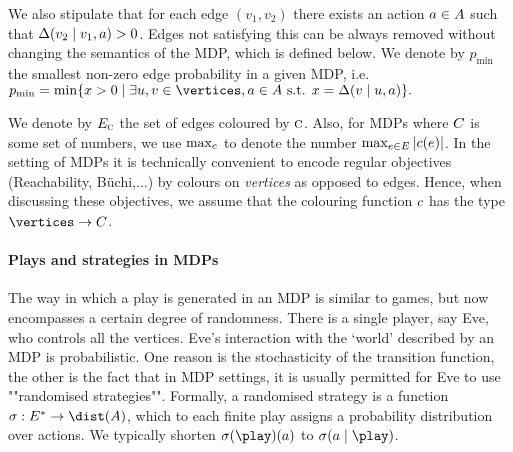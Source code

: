We also stipulate that for each edge $(v_1,v_2)$ there exists an action $a\in A$ such that $\Delta(v_2\mid v_1,a)>0$. Edges not satisfying this can be always removed without changing the semantics of the MDP, which is defined below. We denote by $ p_{\min} $ the smallest non-zero edge probability in a given MDP, i.e. $ p_{\min} = \min\{x>0 \mid \exists u,v \in \vertices, a \in \actions \text{ s.t. } x = \probTranFunc(v\mid u,a)\}. $

We denote by $E_{\textsc{c}}$ the set of edges coloured by $\textsc{c}$. Also, for MDPs where $C$ is some set of numbers, we use $\max_{c}$ to denote the number $\max_{e\in 
	E}|c(e)|$.
In the setting of MDPs it is technically convenient to encode regular objectives (Reachability, B{\"u}chi,$\dots$) by colours on \emph{vertices} as opposed to edges. Hence, when discussing these objectives, we assume that the colouring function $c$ has the type $\vertices \rightarrow \colours$.



\paragraph{Plays and strategies in MDPs}


 The way in which a play is generated in an MDP is similar to games, but now encompasses a certain degree of randomness. There is a single player, say Eve, who controls all the vertices. Eve's interaction with the `world' described by an MDP is probabilistic. One reason is the stochasticity of the transition function, the other is the fact that in MDP settings, it is usually permitted for Eve to use ""randomised strategies"". Formally, a randomised strategy is a function $\sigma : E^* \to \dist(A)$, which to each finite play assigns a probability distribution over actions. 
 We typically shorten $\sigma(\play)(a)$ to $\sigma(a\mid \play)$.
 
